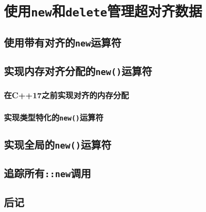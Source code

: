 \chapter{使用\texttt{new}和\texttt{delete}管理超对齐数据}\label{ch30}

\section{使用带有对齐的\texttt{new}运算符}

\section{实现内存对齐分配的\texttt{new()}运算符}
\subsection{在C++17之前实现对齐的内存分配}
\subsection{实现类型特化的\texttt{new()}运算符}\label{ch30.2.2}

\section{实现全局的\texttt{new()}运算符}

\section{追踪所有\texttt{::new}调用}\label{ch30.4}

\section{后记}